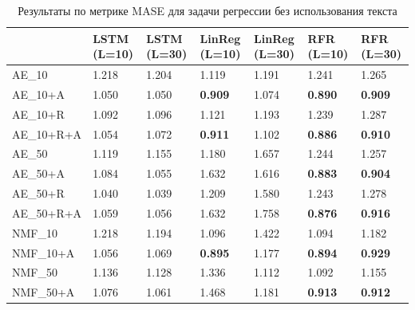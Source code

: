 \begin{center}
\begin{table}
 \begin{tabular}{||p{3.8cm}|p{1.5cm}|p{1.5cm}|p{1.5cm}|p{1.5cm}|p{1.5cm}|p{1.5cm}||} 
\hline
& LSTM (L=10) & LSTM (L=30) & LinReg (L=10) & LinReg (L=30) & RFR (L=10) & RFR (L=30)\\ \hline\hline
AE\_10 & 1.218 & 1.204 & 1.119 & 1.191 & 1.241 & 1.265\\ \hline
AE\_10+A & 1.050 & 1.050 & \textbf{0.909} & 1.074 & \textbf{0.890} & \textbf{0.909}\\ \hline
AE\_10+R & 1.092 & 1.096 & 1.121 & 1.193 & 1.239 & 1.287\\ \hline
AE\_10+R+A & 1.054 & 1.072 & \textbf{0.911} & 1.102 & \textbf{0.886} & \textbf{0.910}\\ \hline
AE\_50 & 1.119 & 1.155 & 1.180 & 1.657 & 1.244 & 1.257\\ \hline
AE\_50+A & 1.084 & 1.055 & 1.632 & 1.616 & \textbf{0.883} & \textbf{0.904}\\ \hline
AE\_50+R & 1.040 & 1.039 & 1.209 & 1.580 & 1.243 & 1.278\\ \hline
AE\_50+R+A & 1.059 & 1.056 & 1.632 & 1.758 & \textbf{0.876} & \textbf{0.916}\\ \hline
NMF\_10 & 1.218 & 1.194 & 1.096 & 1.422 & 1.094 & 1.182\\ \hline
NMF\_10+A & 1.056 & 1.069 & \textbf{0.895} & 1.177 & \textbf{0.894} & \textbf{0.929}\\ \hline
NMF\_50 & 1.136 & 1.128 & 1.336 & 1.112 & 1.092 & 1.155\\ \hline
NMF\_50+A & 1.076 & 1.061 & 1.468 & 1.181 & \textbf{0.913} & \textbf{0.912}\\ \hline
  
\end{tabular}
\caption{\label{tab:reg-res-no-text} Результаты по метрике MASE для задачи регрессии без использования текста}
\end{table}
\end{center}

